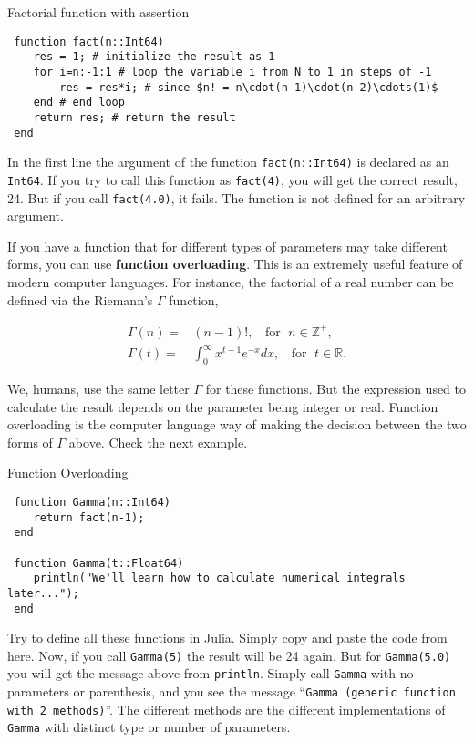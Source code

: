 \begin{example}{Factorial function with assertion}
\label{ex:fact}
\begin{verbatim}
 function fact(n::Int64)
    res = 1; # initialize the result as 1
    for i=n:-1:1 # loop the variable i from N to 1 in steps of -1
        res = res*i; # since $n! = n\cdot(n-1)\cdot(n-2)\cdots(1)$
    end # end loop
    return res; # return the result
 end
\end{verbatim}
\end{example}

In the first line the argument of the function \texttt{fact(n::Int64)} is declared as an \texttt{Int64}. If you try to call this function as \texttt{fact(4)}, you will get the correct result, 24. But if you call \texttt{fact(4.0)}, it fails. The function is not defined for an arbitrary argument. 

If you have a function that for different types of parameters may take different forms, you can use \textbf{function overloading}. This is an extremely useful feature of modern computer languages. For instance, the factorial of a real number can be defined via the Riemann's $\Gamma$ function, 

\begin{align}
 \Gamma(n) =& (n-1)!, \;\; \text{ for } \; n \in \mathbb{Z}^+, \\
 \Gamma(t) =& \int_0^\infty x^{t-1} e^{-x} dx, \;\; \text{ for } \; t \in \mathbb{R}.
\end{align}

We, humans, use the same letter $\Gamma$ for these functions. But the expression used to calculate the result depends on the parameter being integer or real. Function overloading is the computer language way of making the decision between the two forms of $\Gamma$ above. Check the next example.

\begin{example}{Function Overloading}
\begin{verbatim}
 function Gamma(n::Int64)
    return fact(n-1);
 end
 
 function Gamma(t::Float64)
    println("We'll learn how to calculate numerical integrals later...");
 end
\end{verbatim}
\end{example}

Try to define all these functions in Julia. Simply copy and paste the code from here. Now, if you call \texttt{Gamma(5)} the result will be 24 again. But for \texttt{Gamma(5.0)} you will get the message above from \texttt{println}. Simply call \texttt{Gamma} with no parameters or parenthesis, and you see the message ``\texttt{Gamma (generic function with 2 methods)}''. The different methods are the different implementations of \texttt{Gamma} with distinct type or number of parameters.

